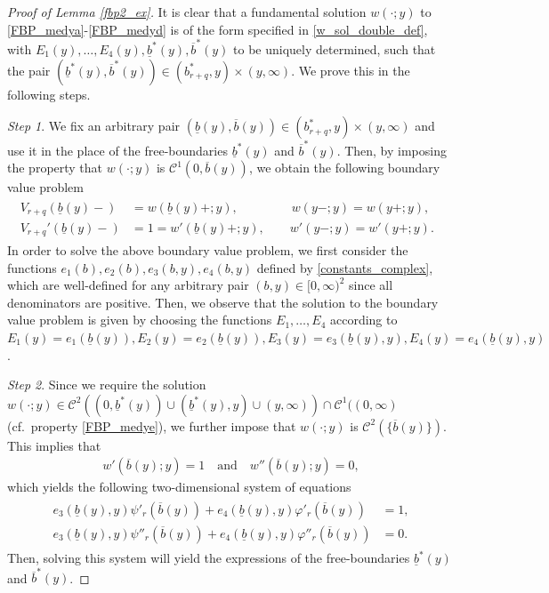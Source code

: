 \documentclass[11pt]{article} %
\renewcommand{\phi}{\varphi}
\newcommand{\ubar}[1]{\underaccent{\bar}{#1}}
\numberwithin{komcounter}{section}
\renewcommand{\ubar}{\underline}
\renewcommand{\bar}{\overline}
\numberwithin{equation}{section}
\numberwithin{theorem}{section}
\begin{document}
\begin{proof}[Proof of Lemma \ref{fbp2_ex}] 
It is clear that a fundamental solution $w(\cdot;y)$ to \eqref{FBP_medya}-\eqref{FBP_medyd} is of the form specified in \eqref{w_sol_double_def}, with $E_1(y), \ldots, E_4(y), \ubar{b}^*(y), \bar{b}^*(y)$ to be uniquely determined, such that the pair $(\ubar{b}^*(y),\bar{b}^*(y)) \in (b_{r+q}^*,y) \times (y,\infty)$.
We prove this in the following steps.

\vspace{1mm}
{\it Step 1}. We fix an arbitrary pair $(\ubar{b}(y),\bar{b}(y)) \in (b_{r+q}^*,y) \times (y,\infty)$ and use it in the place of the free-boundaries $\ubar{b}^*(y)$ and $\bar{b}^*(y)$.  
Then, by imposing the property that $w(\cdot;y)$ is $\mathcal{C}^1(0,\bar{b}(y))$, we obtain the following boundary value problem 
\begin{align}
\begin{split}
V_{r+q}(\ubar{b}(y)-) &= w(\ubar{b}(y)+;y), \qquad \qquad \; 
w(y-;y) = w(y+;y), \quad \\
V_{r+q}'(\ubar{b}(y)-) &= 1 = w'(\ubar{b}(y)+;y), \qquad 
w'(y-;y) = w'(y+;y). 
\end{split}
\label{medy_lineareq}
\end{align}
In order to solve the above boundary value problem, we first consider the functions $e_1(b), e_2(b), e_3(b,y), e_4(b,y)$ defined by \eqref{constants_complex}, which are well-defined for any arbitrary pair $(b,y)\in[0,\infty)^2$ since all denominators are positive. 
Then, we observe that the solution to the boundary value problem is given by choosing the functions $E_1, \ldots, E_4$ according to 
$E_1(y) = e_1(\ubar{b}(y)), 
E_2(y) = e_2(\ubar{b}(y)), 
E_3(y) = e_3(\ubar{b}(y),y), 
E_4(y) = e_4(\ubar{b}(y),y)$.


\vspace{1mm}
{\it Step 2}. 
Since we require the solution $w(\cdot;y) \in \mathcal{C}^2((0,\ubar{b}^*(y)) \cup (\ubar{b}^*(y),y) \cup (y,\infty)) \cap \mathcal{C}^1((0,\infty)$ (cf.~property \eqref{FBP_medye}), we further impose that $w(\cdot;y)$ is $\mathcal{C}^2(\{\bar{b}(y)\})$.
This implies that 
\begin{align}\label{v_optimal_eqwww}
w'(\bar{b}(y);y)=1 
\quad \text{and} \quad 
w''(\bar{b}(y);y)=0,
\end{align}
which yields the following two-dimensional system of equations 
\begin{align} \label{eq_system_midy}
\begin{split}
e_3(\ubar{b}(y),y) \psi'_r(\bar{b}(y)) + e_4(\ubar{b}(y),y) \phi'_r(\bar{b}(y)) &= 1,\\
e_3(\ubar{b}(y),y) \psi''_r(\bar{b}(y)) + e_4(\ubar{b}(y),y) \phi''_r(\bar{b}(y)) &=0.
\end{split}
\end{align}
Then, solving this system will yield the expressions of the free-boundaries $\ubar{b}^*(y)$ and $\bar{b}^*(y)$. 


\end{proof}
\end{document}
